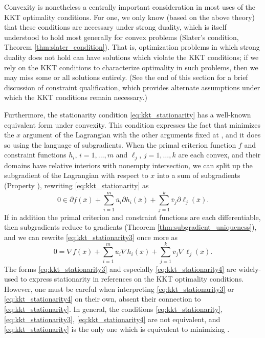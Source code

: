 Convexity is nonetheless a centrally important consideration in most uses of the
KKT optimality conditions. For one, we only know (based on the above theory)
that these conditions are necessary under strong duality, which is itself
understood to hold most generally for convex problems (Slater's condition,
Theorem \ref{thm:slater_condition}). That is, optimization problems in which
strong duality does not hold can have solutions which violate the KKT
conditions; if we rely on the KKT conditions to characterize optimality in such
problems, then we may miss some or all solutions entirely. (See the end of this
section for a brief discussion of constraint qualification, which provides
alternate assumptions under which the KKT conditions remain necessary.)

Furthermore, the stationarity condition \eqref{eq:kkt_stationarity} has a
well-known equivalent form under convexity. This condition expresses the fact
that  minimizes the $x$ argument of the Lagrangian with the
other arguments fixed at , and it does so using the
language of subgradients. When the primal criterion function $f$ and constraint
functions $h_i$, $i=1,\dots,m$ and $\ell_j$, $j=1,\dots,k$ are each convex, and 
their domains have relative interiors with nonempty intersection, we can split
up the subgradient of the Lagrangian with respect to $x$ into a sum of
subgradients (Property ), rewriting
\eqref{eq:kkt_stationarity} as    
\begin{equation}
\label{eq:kkt_stationarity3}
0 \in \partial f(\bar{x}) + \sum_{i=1}^m \bar{u}_i \partial h_i(\bar{x}) +
\sum_{j=1}^k \bar{v}_j \partial \ell_j(\bar{x}).
\end{equation}
If in addition the primal criterion and constraint functions are each
differentiable, then subgradients reduce to gradients (Theorem
\ref{thm:subgradient_uniqueness}), and we can rewrite  
\eqref{eq:kkt_stationarity3} once more as  
\begin{equation}
\label{eq:kkt_stationarity4}
0 = \nabla f(\bar{x}) + \sum_{i=1}^m \bar{u}_i \nabla h_i(\bar{x}) +
\sum_{j=1}^k \bar{v}_j \nabla \ell_j(\bar{x}).
\end{equation}
The forms \eqref{eq:kkt_stationarity3} and especially
\eqref{eq:kkt_stationarity4} are widely-used to express stationarity in
references on the KKT optimality conditions. However, one must be careful when
interpreting \eqref{eq:kkt_stationarity3} or \eqref{eq:kkt_stationarity4} on
their own, absent their connection to \eqref{eq:kkt_stationarity}. In general,
the conditions \eqref{eq:kkt_stationarity}, \eqref{eq:kkt_stationarity3},
\eqref{eq:kkt_stationarity4} are not equivalent, and \eqref{eq:kkt_stationarity}
is the only one which is equivalent to  minimizing
.    

